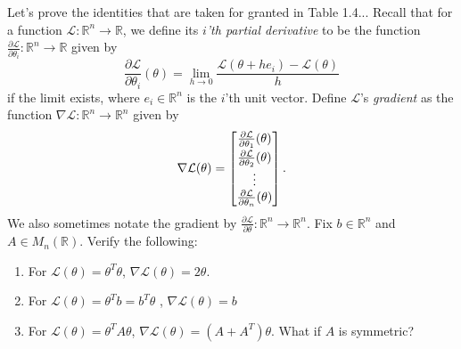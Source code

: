 \documentclass{article}
\newcommand{\R}{\mathbb{R}}
\newenvironment{envsection}[1]{\begin{trivlist}
\item[\hskip \labelsep {\bfseries #1}]}{\end{trivlist}}
\begin{document}
\begin{envsection}{Problem 3 (Matrix Calculus).}
    Let's prove the identities that are taken for granted in Table 1.4... Recall that for a function $\mathcal{L} : \R^n \to \R$, we define its \textit{$i$'th partial derivative} to be the function $\frac{\partial \mathcal{L}}{\partial \theta_i}: \R^n \to \R$ given by
    \[
    \frac{\partial \mathcal{L}}{\partial \theta_i}(\theta) = \lim_{h \to 0} \frac{\mathcal{L}(\theta + he_i) - \mathcal{L}(\theta)}{h}
    \]
    if the limit exists, where $e_i \in \R^n$ is the $i$'th unit vector. Define $\mathcal{L}$'s \textit{gradient} as the function $\nabla \mathcal{L}: \R^n \to \R^n$ given by
    \[
    \nabla \mathcal{L}(\theta) =
    \begin{bmatrix}
        \frac{\partial \mathcal{L}}{\partial \theta_1}(\theta)\vspace{2pt}\\
        \frac{\partial \mathcal{L}}{\partial \theta_2}(\theta)\\
        \vdots\\
        \frac{\partial \mathcal{L}}{\partial \theta_n}(\theta)\\
    \end{bmatrix}.
    \]
    We also sometimes notate the gradient by $\frac{\partial\mathcal{L}}{\partial\theta}: \R^n \to \R^n$. Fix $b \in \R^n$ and $A \in M_{n}(\R)$. Verify the following:
    \begin{enumerate}
        \item[(a)] For $\mathcal{L}(\theta) = \theta^T\theta$,\; $\nabla \mathcal{L}(\theta) = 2\theta$.
        \item[(b)] For $\mathcal{L}(\theta) = \theta^Tb = b^T\theta$ ,\; $\nabla \mathcal{L}(\theta) = b$
        \item[(c)] For $\mathcal{L}(\theta) = \theta^T A \theta$,\; $\nabla \mathcal{L}(\theta) = (A+A^T)\theta$. What if $A$ is symmetric?
    \end{enumerate}
    
\end{envsection}
\end{document}
